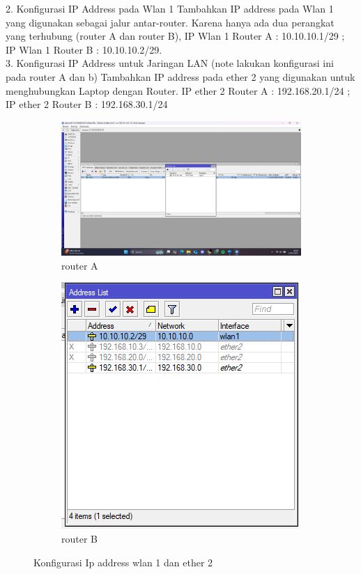 2. Konfigurasi IP Address pada Wlan 1 Tambahkan IP address pada Wlan 1 yang digunakan sebagai jalur antar-router. Karena hanya ada dua perangkat yang terhubung (router A dan router B), IP Wlan 1 Router A : 10.10.10.1/29 ; IP Wlan 1 Router B : 10.10.10.2/29. \\
3. Konfigurasi IP Address untuk Jaringan LAN (note lakukan konfigurasi ini pada router A dan b) Tambahkan IP address pada ether 2 yang digunakan untuk menghubungkan Laptop dengan Router. IP ether 2 Router A : 192.168.20.1/24 ; IP ether 2 Router B : 192.168.30.1/24
\begin{figure}[H]
    \centering
    \begin{subfigure}[b]{0.3\linewidth}
      \centering
      \includegraphics[width=\linewidth]{image/bridge4.jpg}
      \caption{router A}
    \end{subfigure}
    \hspace{1cm}
    \begin{subfigure}[b]{0.3\linewidth}
      \centering
      \includegraphics[width=\linewidth]{image/bridge1.png}
      \caption{router B}
    \end{subfigure}
    \caption{Konfigurasi Ip address wlan 1 dan ether 2}
\end{figure}

